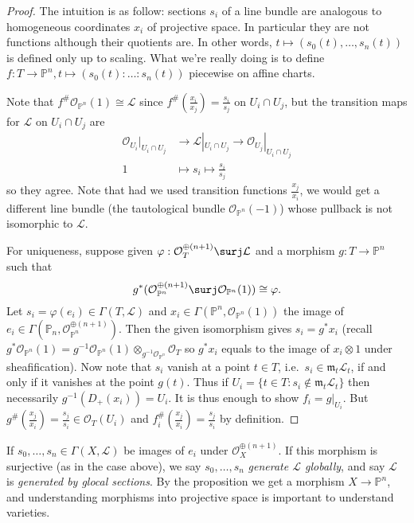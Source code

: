 \documentclass[a4paper]{article}
\renewcommand*{\P}{\mathbb{P}}
\newcommand{\sh}[1]{\mathcal{#1}} %
\begin{document}
\begin{proof}
  The intuition is as follow: sections \(s_i\) of a line bundle are analogous to homogeneous coordinates \(x_i\) of projective space. In particular they are not functions although their quotients are. In other words, \(t \mapsto (s_0(t), \dots, s_n(t))\) is defined only up to scaling. What we're really doing is to define \(f: T \to \P^n, t \mapsto (s_0(t): \dots : s_n(t))\) piecewise on affine charts.

  Note that \(f^\# \sh O_{\P^n}(1) \cong \sh L\) since \(f^\#(\frac{x_i}{x_j}) = \frac{s_i}{s_j}\) on \(U_i \cap U_j\), but the transition maps for \(\sh L\) on \(U_i \cap U_j\) are
  \begin{align*}
    \sh O_{U_i}|_{U_i \cap U_j} &\to \sh L|_{U_i \cap U_j} \to \sh O_{U_j}|_{U_i \cap U_j} \\
    1 &\mapsto s_i \mapsto \frac{s_i}{s_j}
  \end{align*}
  so they agree. Note that had we used transition functions \(\frac{x_j}{x_i}\), we would get a different line bundle (the tautological bundle \(\sh O_{\P^n}(-1)\)) whose pullback is not isomorphic to \(\sh L\).

  For uniqueness, suppose given \(\varphi: \sh O_T^{\oplus(n + 1)} \surj \sh L\) and a morphism \(g: T \to \P^n\) such that
  \[
    g^*(\sh O_{\P^n}^{\oplus(n + 1)} \surj \sh O_{\P^n}(1)) \cong \varphi.
  \]
  Let \(s_i = \varphi(e_i) \in \Gamma(T, \sh L)\) and \(x_i \in \Gamma(\P^n, \sh O_{\P^n}(1))\) the image of \(e_i \in \Gamma(\P_n, \sh O_{\P^n}^{\oplus(n + 1)})\). Then the given isomorphism gives \(s_i = g^*x_i\) (recall \(g^* \sh O_{\P^n}(1) = g^{-1} \sh O_{\P^n}(1) \otimes_{g^{-1} \sh O_{\P^n}} \sh O_T\) so \(g^*x_i\) equals to the image of \(x_i \otimes 1\) under sheafification). Now note that \(s_i\) vanish at a point \(t \in T\), i.e.\ \(s_i \in \mathfrak m_t \sh L_t\), if and only if it vanishes at the point \(g(t)\). Thus if \(U_i = \{t \in T: s_i \notin \mathfrak m_t \sh L_t\}\) then necessarily \(g^{-1}(D_+(x_i)) = U_i\). It is thus enough to show \(f_i = g|_{U_i}\). But \(g^\#(\frac{x_j}{x_i}) = \frac{s_j}{s_i} \in \sh O_T(U_i)\) and \(f_i^\#(\frac{x_j}{x_i}) = \frac{s_j}{s_i}\) by definition.
\end{proof}

If \(s_0, \dots, s_n \in \Gamma(X, \sh L)\) be images of \(e_i\) under \(\sh O_X^{\oplus(n + 1)}\). If this morphism is surjective (as in the case above), we say \(s_0, \dots, s_n\) \emph{generate \(\sh L\) globally}, and say \(\sh L\) is \emph{generated by glocal sections}. By the proposition we get a morphism \(X \to \P^n\), and understanding morphisms into projective space is important to understand varieties.
\end{document}
